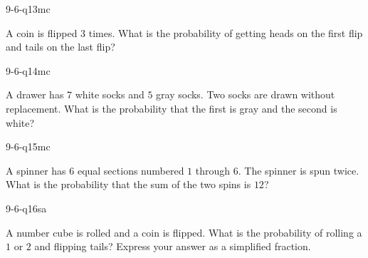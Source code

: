 \begin{practiceQuestion}{9-6-q13}{mc}
\begin{questionText}
A coin is flipped $3$ times. What is the probability of getting heads on the first flip and tails on the last flip?
\end{questionText}
\end{practiceQuestion}

\begin{practiceQuestion}{9-6-q14}{mc}
\begin{questionText}
A drawer has $7$ white socks and $5$ gray socks. Two socks are drawn without replacement. What is the probability that the first is gray and the second is white?
\end{questionText}
\end{practiceQuestion}

\begin{practiceQuestion}{9-6-q15}{mc}
\begin{questionText}
A spinner has $6$ equal sections numbered $1$ through $6$. The spinner is spun twice. What is the probability that the sum of the two spins is $12$?
\end{questionText}
\end{practiceQuestion}


\begin{practiceQuestion}{9-6-q16}{sa}
\begin{questionText}
A number cube is rolled and a coin is flipped. What is the probability of rolling a $1$ or $2$ and flipping tails? Express your answer as a simplified fraction.
\end{questionText}
\end{practiceQuestion}

